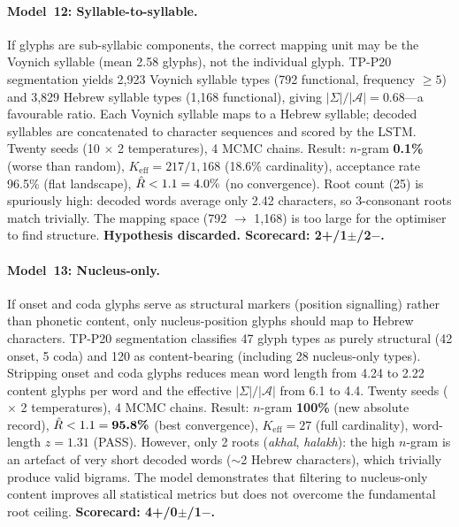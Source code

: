 \paragraph{Model~12: Syllable-to-syllable.}
If glyphs are sub-syllabic components, the correct mapping unit may be the Voynich syllable (mean 2.58 glyphs), not the individual glyph.  TP-P20 segmentation yields 2,923 Voynich syllable types (792 functional, frequency $\geq 5$) and 3,829 Hebrew syllable types (1,168 functional), giving $|\Sigma|/|\mathcal{A}| = 0.68$---a favourable ratio.  Each Voynich syllable maps to a Hebrew syllable; decoded syllables are concatenated to character sequences and scored by the LSTM.  Twenty seeds (10 $\times$ 2 temperatures), 4 MCMC chains.  Result: $n$-gram \textbf{0.1\%} (worse than random), $K_{\text{eff}} = 217/1{,}168$ (18.6\% cardinality), acceptance rate 96.5\% (flat landscape), $\hat{R} < 1.1 = 4.0\%$ (no convergence).  Root count (25) is spuriously high: decoded words average only 2.42 characters, so 3-consonant roots match trivially.  The mapping space (792 $\to$ 1,168) is too large for the optimiser to find structure.  \textbf{Hypothesis discarded.  Scorecard: 2+/1$\pm$/2$-$.}

\paragraph{Model~13: Nucleus-only.}
If onset and coda glyphs serve as structural markers (position signalling) rather than phonetic content, only nucleus-position glyphs should map to Hebrew characters.  TP-P20 segmentation classifies 47 glyph types as purely structural (42 onset, 5 coda) and 120 as content-bearing (including 28 nucleus-only types).  Stripping onset and coda glyphs reduces mean word length from 4.24 to 2.22 content glyphs per word and the effective $|\Sigma|/|\mathcal{A}|$ from 6.1 to 4.4.  Twenty seeds ($\times$ 2 temperatures), 4 MCMC chains.  Result: $n$-gram \textbf{100\%} (new absolute record), $\hat{R} < 1.1 = \textbf{95.8\%}$ (best convergence), $K_{\text{eff}} = 27$ (full cardinality), word-length $z = 1.31$ (PASS).  However, only 2 roots (\emph{akhal}, \emph{halakh}): the high $n$-gram is an artefact of very short decoded words ($\sim$2 Hebrew characters), which trivially produce valid bigrams.  The model demonstrates that filtering to nucleus-only content improves all statistical metrics but does not overcome the fundamental root ceiling.  \textbf{Scorecard: 4+/0$\pm$/1$-$.}

